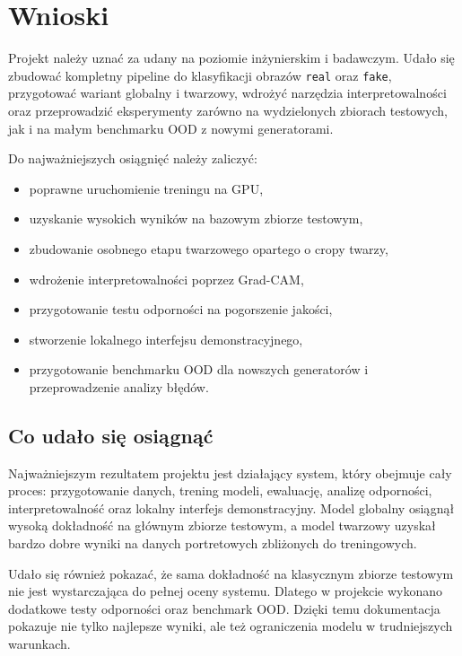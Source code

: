 \newpage
\section{Wnioski}

Projekt należy uznać za udany na poziomie inżynierskim i badawczym. Udało się zbudować kompletny pipeline do klasyfikacji obrazów \texttt{real} oraz \texttt{fake}, przygotować wariant globalny i twarzowy, wdrożyć narzędzia interpretowalności oraz przeprowadzić eksperymenty zarówno na wydzielonych zbiorach testowych, jak i na małym benchmarku OOD z nowymi generatorami.

Do najważniejszych osiągnięć należy zaliczyć:

\begin{itemize}
    \item poprawne uruchomienie treningu na GPU,
    \item uzyskanie wysokich wyników na bazowym zbiorze testowym,
    \item zbudowanie osobnego etapu twarzowego opartego o cropy twarzy,
    \item wdrożenie interpretowalności poprzez Grad-CAM,
    \item przygotowanie testu odporności na pogorszenie jakości,
    \item stworzenie lokalnego interfejsu demonstracyjnego,
    \item przygotowanie benchmarku OOD dla nowszych generatorów i przeprowadzenie analizy błędów.
\end{itemize}

\subsection{Co udało się osiągnąć}

Najważniejszym rezultatem projektu jest działający system, który obejmuje cały proces: przygotowanie danych, trening modeli, ewaluację, analizę odporności, interpretowalność oraz lokalny interfejs demonstracyjny. Model globalny osiągnął wysoką dokładność na głównym zbiorze testowym, a model twarzowy uzyskał bardzo dobre wyniki na danych portretowych zbliżonych do treningowych.

Udało się również pokazać, że sama dokładność na klasycznym zbiorze testowym nie jest wystarczająca do pełnej oceny systemu. Dlatego w projekcie wykonano dodatkowe testy odporności oraz benchmark OOD. Dzięki temu dokumentacja pokazuje nie tylko najlepsze wyniki, ale też ograniczenia modelu w trudniejszych warunkach.

